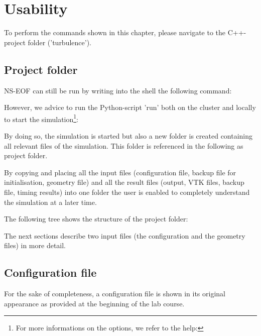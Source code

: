 
\chapter{Usability} %
\label{cha:usability}
To perform the commands shown in this chapter, please navigate to the C++-project folder ('turbulence').


\section{Project folder} %
\label{sec:project_folder}

NS-EOF can still be run by writing into the shell the following command:


\noii However, we advice to run the Python-script 'run' both on the cluster and locally to start the simulation\footnote{For more informations on the options, we refer to the help:
}:


\noii By doing so, the simulation is started but also a new folder is created containing all relevant files of the simulation. This folder is referenced in the following as project folder.

\noii By copying and placing all the input files (configuration file, backup file for initialisation, geometry file) and all the result files (output, VTK files, backup file, timing results) into one folder the user is enabled to completely understand the simulation at a later time.

\noii The following tree shows the structure of the project folder:

\noii The next sections describe two input files (the configuration and the geometry files) in more detail.

\clearpage

\section{Configuration file} %
\label{sec:configuration_file}

For the sake of completeness, a configuration file is shown in its original appearance as provided at the beginning of the lab course. 

